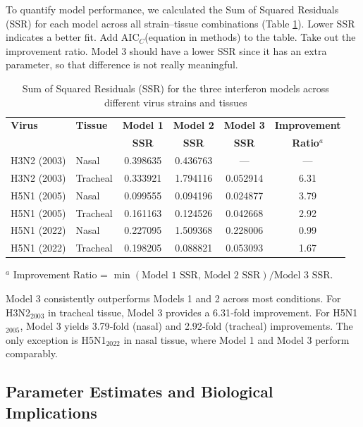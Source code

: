 \documentclass[12pt]{article}
\newcommand{\aicc}{\ensuremath{\mathrm{AIC}_C}\xspace}
\begin{document}
To quantify model performance, we calculated the Sum of Squared Residuals (SSR) for each model across all strain–tissue combinations (Table \ref{tab:SSR_comparison}). Lower SSR indicates a better fit. \color{red} Add \aicc (equation in methods) to the table. Take out the improvement ratio. Model 3 should have a lower SSR since it has an extra parameter, so that difference is not really meaningful.\color{black}

\begin{table}[ht]
\centering
\small
\caption{Sum of Squared Residuals (SSR) for the three interferon models across different virus strains and tissues}
\begin{tabular}{@{}llcccc@{}}
\toprule
\textbf{Virus} & \textbf{Tissue} & \textbf{Model 1} & \textbf{Model 2} & \textbf{Model 3} & \textbf{Improvement} \\ 
 & & \textbf{SSR} & \textbf{SSR} & \textbf{SSR} & \textbf{Ratio\(^a\)} \\ 
\midrule
H3N2 (2003) & Nasal    & 0.398635 & 0.436763 & —       & —    \\
H3N2 (2003) & Tracheal & 0.333921 & 1.794116 & 0.052914 & 6.31 \\
H5N1 (2005) & Nasal    & 0.099555 & 0.094196 & 0.024877 & 3.79 \\
H5N1 (2005) & Tracheal & 0.161163 & 0.124526 & 0.042668 & 2.92 \\
H5N1 (2022) & Nasal    & 0.227095 & 1.509368 & 0.228006 & 0.99 \\
H5N1 (2022) & Tracheal & 0.198205 & 0.088821 & 0.053093 & 1.67 \\
\bottomrule
\end{tabular}
\vspace{2mm}
\small{\(^a\) Improvement Ratio = \(\min(\text{Model 1 SSR},\,\text{Model 2 SSR}) / \text{Model 3 SSR}\).}
\label{tab:SSR_comparison}
\end{table}

Model 3 consistently outperforms Models 1 and 2 across most conditions. For H3N2$_{2003}$ in tracheal tissue, Model 3 provides a 6.31‐fold improvement. For H5N1$_{2005}$, Model 3 yields 3.79‐fold (nasal) and 2.92‐fold (tracheal) improvements. The only exception is H5N1$_{2022}$ in nasal tissue, where Model 1 and Model 3 perform comparably.

\subsection{Parameter Estimates and Biological Implications}
\end{document}
